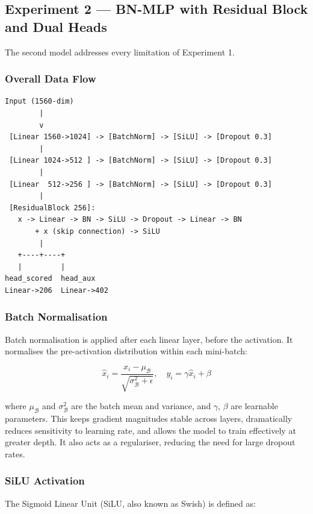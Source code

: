 \documentclass[12pt, a4paper]{article}
\begin{document}
\subsection{Experiment 2 — BN-MLP with Residual Block and Dual Heads}

The second model addresses every limitation of Experiment 1.

\subsubsection{Overall Data Flow}

\begin{verbatim}
Input (1560-dim)
        |
        v
 [Linear 1560->1024] -> [BatchNorm] -> [SiLU] -> [Dropout 0.3]
        |
 [Linear 1024->512 ] -> [BatchNorm] -> [SiLU] -> [Dropout 0.3]
        |
 [Linear  512->256 ] -> [BatchNorm] -> [SiLU] -> [Dropout 0.3]
        |
 [ResidualBlock 256]:
   x -> Linear -> BN -> SiLU -> Dropout -> Linear -> BN
       + x (skip connection) -> SiLU
        |
   +----+----+
   |         |
head_scored  head_aux
Linear->206  Linear->402
\end{verbatim}

\subsubsection{Batch Normalisation}

Batch normalisation \cite{ioffe2015batch} is applied after each linear layer, before the activation. It normalises the pre-activation distribution within each mini-batch:

\begin{equation}
\hat{x}_i = \frac{x_i - \mu_\mathcal{B}}{\sqrt{\sigma^2_\mathcal{B} + \epsilon}}, \quad y_i = \gamma \hat{x}_i + \beta
\end{equation}

where $\mu_\mathcal{B}$ and $\sigma^2_\mathcal{B}$ are the batch mean and variance, and $\gamma$, $\beta$ are learnable parameters. This keeps gradient magnitudes stable across layers, dramatically reduces sensitivity to learning rate, and allows the model to train effectively at greater depth. It also acts as a regulariser, reducing the need for large dropout rates.

\subsubsection{SiLU Activation}

The Sigmoid Linear Unit (SiLU, also known as Swish) is defined as:
\end{document}
